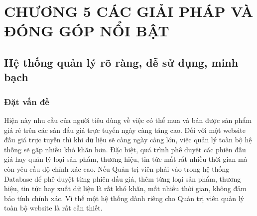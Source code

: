 \documentclass{article}
\begin{document}
\section*{CHƯƠNG 5 CÁC GIẢI PHÁP VÀ ĐÓNG GÓP NỔI BẬT}
\setcounter{section}{5}
\setcounter{subsection}{0}
\subsection{Hệ thống quản lý rõ ràng, dễ sử dụng, minh bạch}
\subsubsection{Đặt vấn đề}
Hiện này nhu cầu của người tiêu dùng về việc có thể mua và bán được sản phẩm giá rẻ trên các sàn đấu giá trực tuyến ngày càng tăng cao. Đối với một website đấu giá trực tuyến thì khi dữ liệu sẽ càng ngày càng lớn, việc quản lý toàn bộ hệ thống sẽ gặp nhiều khó khăn hơn. Đặc biệt, quá trình phê duyệt các phiên đấu giá hay quản lý loại sản phẩm, thương hiệu, tin tức mất rất nhiều thời gian mà còn yêu cầu độ chính xác cao. Nếu Quản trị viên phải vào trong hệ thống Database để phê duyệt từng phiên đấu giá, thêm từng loại sản phẩm, thương hiệu, tin tức hay xuất dữ liệu là rất khó khăn, mất nhiều thời gian, không đảm bảo tính chính xác. Vì thế một hệ thống dành riêng cho Quản trị viên quản lý toàn bộ website là rất cần thiết. 
\end{document}
